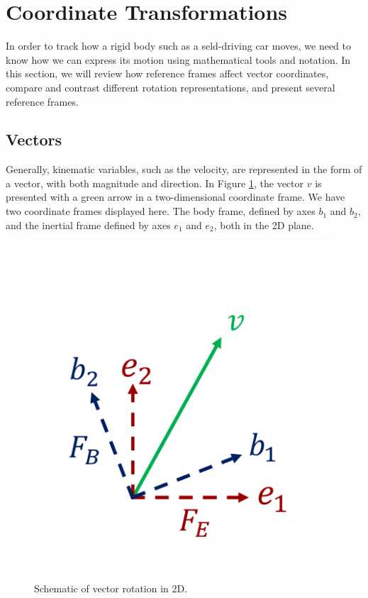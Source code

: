 \section{Coordinate Transformations}
\label{coordinate_transformations}


In order to  track how a rigid body such as a seld-driving car moves, we need to know how we can express its motion using
mathematical tools and notation. In this section, we will review how reference frames affect vector coordinates, compare and contrast different
rotation representations, and present several reference frames.


\subsection{Vectors}

Generally, kinematic variables, such as the velocity, are represented in the form of a vector, with both magnitude and direction. In Figure \ref{vector_rotation}, the vector $v$ is presented with a green arrow in a two-dimensional coordinate frame. We have two coordinate frames displayed here. The body frame, defined by axes $b_1$ and $b_2$, and the inertial frame defined by axes $e_1$ and $e_2$, both in the 2D plane.


\begin{figure}[!htb]
\begin{center}
\includegraphics[scale=0.290]{img/coordinate_transforms/vector_rotation.jpeg}
\end{center}
\caption{Schematic of vector rotation in 2D.}
\label{vector_rotation}
\end{figure} 

